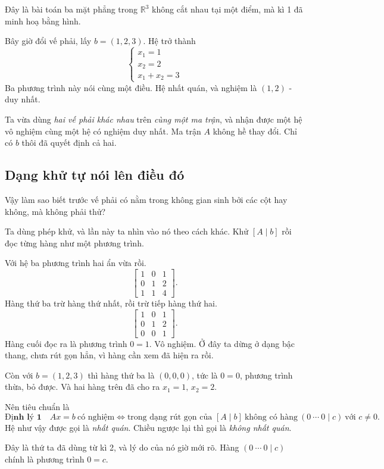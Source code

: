 \documentclass[12pt,a4paper]{article}
\begin{document}
Đây là bài toán ba mặt phẳng trong \(\mathbb R^3\) không cắt nhau tại một điểm, mà kì 1 đã minh hoạ bằng hình.

Bây giờ đổi vế phải, lấy \(b=(1,2,3)\). Hệ trở thành
$$
\begin{cases}
x_1=1\\
x_2=2\\
x_1+x_2=3
\end{cases}
$$
Ba phương trình này nói cùng một điều. Hệ nhất quán, và nghiệm là \((1,2)\) - duy nhất.

Ta vừa dùng \emph{hai vế phải khác nhau} trên \emph{cùng một ma trận}, và nhận được một hệ vô nghiệm cùng một hệ có nghiệm duy nhất. Ma trận \(A\) không hề thay đổi. Chỉ có \(b\) thôi đã quyết định cả hai.

\subsection{Dạng khử tự nói lên điều đó}

Vậy làm sao biết trước vế phải có nằm trong không gian sinh bởi các cột hay không, mà không phải thử?

Ta dùng phép khử, và lần này ta nhìn vào nó theo cách khác. Khử \([A\mid b]\) rồi đọc từng hàng như một phương trình.

Với hệ ba phương trình hai ẩn vừa rồi.
$$
\left[ \begin{array}{rr|r} 1&0&1\\ 0&1&2\\ 1&1&4 \end{array} \right].
$$
Hàng thứ ba trừ hàng thứ nhất, rồi trừ tiếp hàng thứ hai.
$$
\left[ \begin{array}{rr|r} 1&0&1\\ 0&1&2\\ 0&0&1 \end{array} \right].
$$
Hàng cuối đọc ra là phương trình \(0=1\). Vô nghiệm. Ở đây ta dừng ở dạng bậc thang, chưa rút gọn hẳn, vì hàng cần xem đã hiện ra rồi.

Còn với \(b=(1,2,3)\) thì hàng thứ ba là \((0,0,0)\), tức là \(0=0\), phương trình thừa, bỏ được. Và hai hàng trên đã cho ra \(x_1=1,\,x_2=2\).

Nên tiêu chuẩn là
$$
\textbf{Định lý 1}\quad Ax=b\ \text{có nghiệm}
\iff
\text{trong dạng rút gọn của } [A\mid b]\ \text{không có hàng}\ (0\ \cdots\ 0\mid c)\ \text{với } c\neq 0.
$$
Hệ như vậy được gọi là \emph{nhất quán}. Chiều ngược lại thì gọi là \emph{không nhất quán}.

Đây là thứ ta đã dùng từ kì 2, và lý do của nó giờ mới rõ. Hàng \((0\ \cdots\ 0\mid c)\) chính là phương trình \(0=c\).
\end{document}
